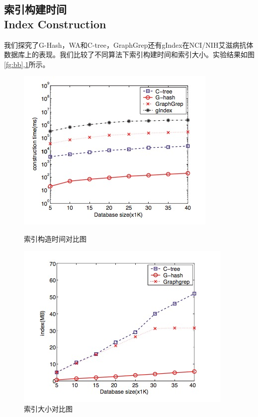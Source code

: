 \documentclass{article}
\begin{document}
\subsection{索引构建时间 \\Index Construction}
我们探究了G-Hash，WA和C-tree，GraphGrep还有gIndex在NCI/NIH艾滋病抗体数据库上的表现。我们比较了不同算法下索引构建时间和索引大小。实验结果如图\ref{fg:bb},\ref{fg:bi}所示。
\begin{figure}[!htb]
    \centering
    \begin{minipage}[t]{0.5\textwidth}
        \centering
        \includegraphics[width=\textwidth]{it}
        \caption{索引构造时间对比图}
        \label{fg:bb}
    \end{minipage}%
    \begin{minipage}[t]{0.5\textwidth}
        \centering
        \includegraphics[width=\textwidth]{is}
        \caption{索引大小对比图}
        \label{fg:bi}
    \end{minipage}
\end{figure}
\end{document}

